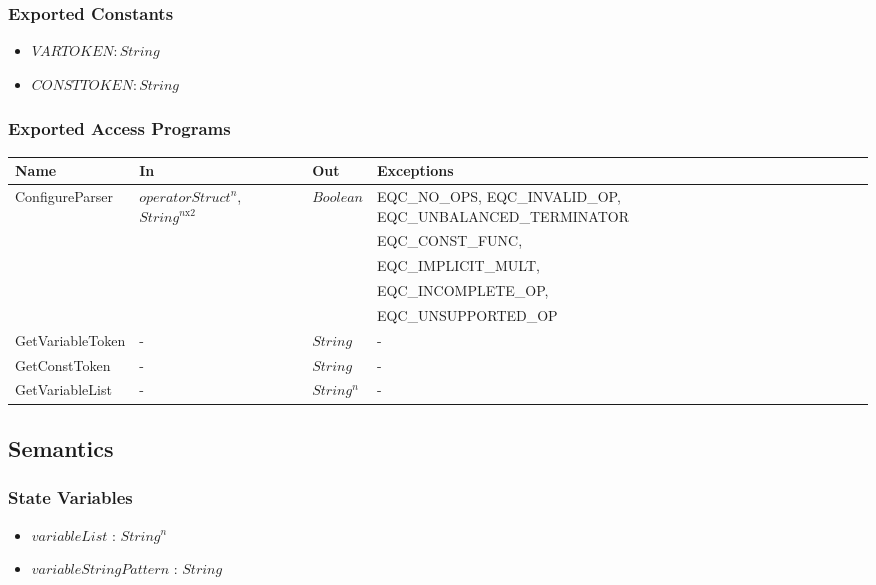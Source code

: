 \documentclass[12pt, titlepage]{article}
\begin{document}
\subsubsection{Exported Constants}

\begin{itemize}
	\item $VARTOKEN : String$
	\item $CONSTTOKEN : String$
\end{itemize}

\subsubsection{Exported Access Programs}

\begin{center}
	\begin{tabular}{p{3.2cm} p{2.8cm} p{3cm} p{5cm}}
		\hline
		\textbf{Name} & \textbf{In} & \textbf{Out} & \textbf{Exceptions} \\
		\hline
		\multirow{3}{3.2cm}{ConfigureParser} & 
		\multirow{3}{2.8cm}{$operatorStruct^n$, $String^{n\text{x}2}$} & 
		\multirow{3}{3cm}{$Boolean$} & EQC\_NO\_OPS, EQC\_INVALID\_OP, 
		EQC\_UNBALANCED\_TERMINATOR\\
		\multirow{4}{3.2cm}{MakeEquationTree} & \multirow{4}{2.8cm}{$String$} & 
		\multirow{4}{3cm}{$equationStruct$} & 
		EQC\_CONST\_FUNC, \\	
		& & & EQC\_IMPLICIT\_MULT, \\
		& & & EQC\_INCOMPLETE\_OP, \\
		& & & EQC\_UNSUPPORTED\_OP \\
		GetVariableToken & - & $String$ & - \\
		GetConstToken & - & $String$ & - \\
		GetVariableList & - & $String^n$ & - \\
		\hline
	\end{tabular}
\end{center}

\subsection{Semantics}

\subsubsection{State Variables}

\begin{itemize}
	\item $variableList$ : $String^n$
	\item $variableStringPattern$ : $String$
\end{itemize}
\end{document}
